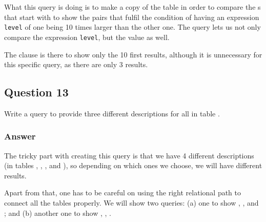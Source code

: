 What this query is doing is to make a copy of the  table in order to compare the s that start with  to show the pairs that fulfil the condition of having an expression \texttt{level} of one being 10 times larger than the other one. The query lets us not only compare the expression \texttt{level}, but the  value as well.



The  clause is there to show only the 10 first results, although it is unnecessary for this specific query, as there are only 3 results.

\subsection*{Question 13}
Write a query to provide three different descriptions for all  in table .

\subsubsection*{Answer}

The tricky part with creating this query is that we have 4 different descriptions (in tables , , , and ), so depending on which ones we choose, we will have different results.

Apart from that, one has to be careful on using the right relational path to connect all the tables properly. We will show two queries: (a) one to show , , and ; and (b) another one to show , , .

